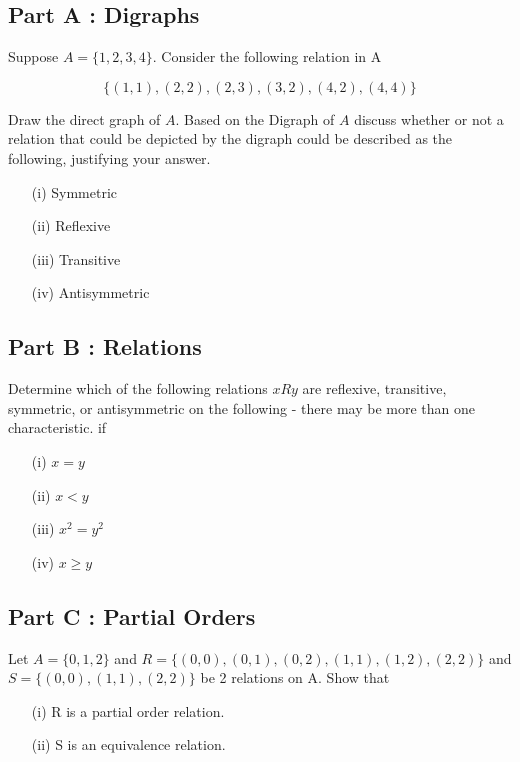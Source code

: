 \subsection*{Part A : Digraphs}

Suppose $A = \{1,2,3,4\}$. Consider the following relation in A

\[ \{  (1,1),(2,2),(2,3),(3,2),(4,2),(4,4)\} \]

Draw the direct graph of $A$. Based on the Digraph of $A$ discuss whether or not a relation that could be depicted by the digraph could be described as the following, justifying your answer.


\begin{itemize}
\item[(i)] Symmetric
\item[(ii)] Reflexive 
\item[(iii)] Transitive
\item[(iv)] Antisymmetric
\end{itemize}
\subsection*{Part B : Relations}
Determine which of the following relations $ x R y$ are reflexive, transitive, symmetric, or antisymmetric on the following - there may be more than one characteristic.  if

\begin{itemize} 
\item[(i)] $x = y$
\item[(ii)] $x < y$
\item[(iii)] $x^2 = y^2$
\item[(iv)] $x \geq y$
\end{itemize}
\subsection*{Part C : Partial Orders}

Let $A=\{0,1,2\}$ and $R=\{ (0,0),(0,1),(0,2),(1,1), (1,2), (2,2)\}$
and $S=\{(0,0),(1,1),(2,2)\}$ be 2 relations on A. Show that

\begin{itemize}
\item[(i)] R is a partial order relation.
\item[(ii)] S is an equivalence relation.
\end{itemize}



